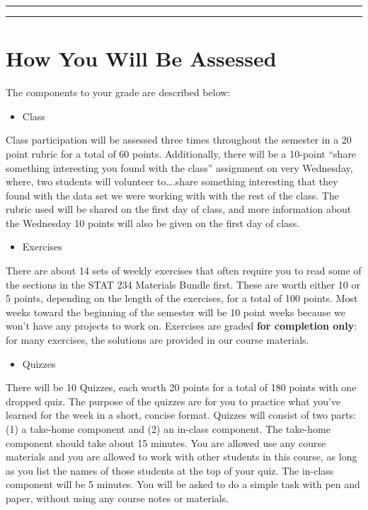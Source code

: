 \documentclass[
]{book}
\providecommand{\tightlist}{%
  \setlength{\itemsep}{0pt}\setlength{\parskip}{0pt}}
\begin{document}
\begin{center}\rule{0.5\linewidth}{0.5pt}\end{center}

\begin{center}\rule{0.5\linewidth}{0.5pt}\end{center}

\hypertarget{how-you-will-be-assessed}{%
\section{How You Will Be Assessed}\label{how-you-will-be-assessed}}

The components to your grade are described below:

\begin{itemize}
\tightlist
\item
  Class
\end{itemize}

Class participation will be assessed three times throughout the semester in a 20 point rubric for a total of 60 points. Additionally, there will be a 10-point ``share something interesting you found with the class'' assignment on very Wednesday, where, two students will volunteer to\ldots.share something interesting that they found with the data set we were working with with the rest of the class. The rubric used will be shared on the first day of class, and more information about the Wednesday 10 points will also be given on the first day of class.

\begin{itemize}
\tightlist
\item
  Exercises
\end{itemize}

There are about 14 sets of weekly exercises that often require you to read some of the sections in the STAT 234 Materials Bundle first. These are worth either 10 or 5 points, depending on the length of the exercises, for a total of 100 points. Most weeks toward the beginning of the semester will be 10 point weeks because we won't have any projects to work on. Exercises are graded \textbf{for completion only}: for many exercises, the solutions are provided in our course materials.

\begin{itemize}
\tightlist
\item
  Quizzes
\end{itemize}

There will be 10 Quizzes, each worth 20 points for a total of 180 points with one dropped quiz. The purpose of the quizzes are for you to practice what you've learned for the week in a short, concise format. Quizzes will consist of two parts: (1) a take-home component and (2) an in-class component. The take-home component should take about 15 minutes. You are allowed use any course materials and you are allowed to work with other students in this course, as long as you list the names of those students at the top of your quiz. The in-class component will be 5 minutes. You will be asked to do a simple task with pen and paper, without using any course notes or materials.
\end{document}
